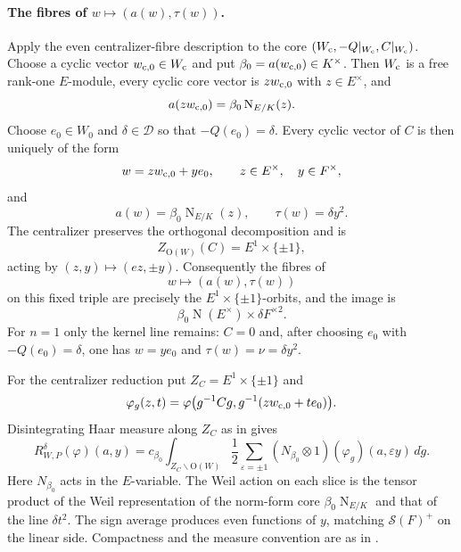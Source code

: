 \documentclass[11pt,oneside,notitlepage]{book}
\numberwithin{equation}{section}
\theoremstyle{plain}
\theoremstyle{definition}
\newcommand{\Ort}{\mathrm{O}}
\newcommand{\cS}{\mathcal{S}}
\newcommand{\Tr}{\operatorname{Tr}}
\newcommand{\N}{\operatorname{N}}
\begin{document}

\paragraph{The fibres of $w\mapsto(a(w),\tau(w))$.}
Apply the even centralizer-fibre description to the core $(W_{\rm c},-Q|_{W_{\rm c}},C|_{W_{\rm c}})$. Choose a cyclic vector $w_{{\rm c},0}\in W_{\rm c}$ and put $\beta_0=a(w_{{\rm c},0})\in K^\times$. Then $W_{\rm c}$ is a free rank-one $E$-module, every cyclic core vector is $z w_{{\rm c},0}$ with $z\in E^\times$, and
\[
a(z w_{{\rm c},0})=\beta_0\N_{E/K}(z).
\]
Choose $e_0\in W_0$ and $\delta\in\mathcal D$ so that $-Q(e_0)=\delta$. Every cyclic vector of $C$ is then uniquely of the form
\[
w=z w_{{\rm c},0}+y e_0,
\qquad z\in E^\times,\quad y\in F^\times,
\]
and
\[
a(w)=\beta_0\N_{E/K}(z),\qquad
\tau(w)=\delta y^2.
\]
The centralizer preserves the orthogonal decomposition and is
\[
Z_{\Ort(W)}(C)=E^1\times\{\pm1\},
\]
acting by $(z,y)\mapsto(ez,\pm y)$. Consequently the fibres of
\[
w\longmapsto(a(w),\tau(w))
\]
on this fixed triple are precisely the $E^1\times\{\pm1\}$-orbits, and the image is
\[
\beta_0\N(E^\times)\times\delta F^{\times2}.
\]
For $n=1$ only the kernel line remains: $C=0$ and, after choosing $e_0$ with $-Q(e_0)=\delta$, one has $w=ye_0$ and $\tau(w)=\nu=\delta y^2$.

For the centralizer reduction put $Z_C=E^1\times\{\pm1\}$ and
\[
\varphi_g(z,t)=\varphi\bigl(g^{-1}Cg,g^{-1}(z w_{{\rm c},0}+t e_0)\bigr).
\]
Disintegrating Haar measure along $Z_C$ as in  gives
\[
R_{W,P}^\delta(\varphi)(a,y)
=c_{\beta_0}\int_{Z_C\backslash\Ort(W)}
\frac12\sum_{\varepsilon=\pm1}
(N_{\beta_0}\otimes1)(\varphi_g)(a,\varepsilon y)\,d\dot g.
\]
Here $N_{\beta_0}$ acts in the $E$-variable. The Weil action on each slice is the tensor product of the Weil representation of the norm-form core $\beta_0\N_{E/K}$ and that of the line $\delta t^2$. The sign average produces even functions of $y$, matching $\cS(F)^+$ on the linear side. Compactness and the measure convention are as in .
\end{document}
